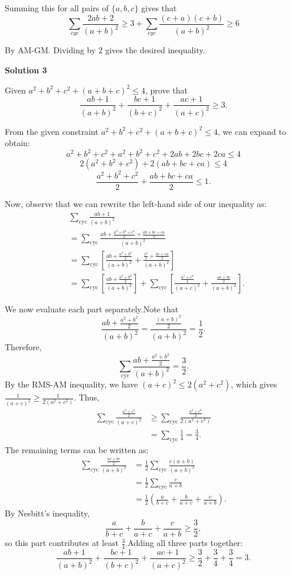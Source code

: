 \begin{enumerate}
 Summing this for all pairs of $\{ a,b,c \}$ gives that
 \[\sum_{cyc} \frac{2ab+2}{(a+b)^2} \ge 3+ \sum_{cyc}\frac{(c+a)(c+b)}{(a+b)^2} \ge 6\]

 By AM-GM. Dividing by $2$ gives the desired inequality.

 



\textbf{Solution 3}

Given $a^2+b^2+c^2+(a+b+c)^2 \leq 4$, prove that
 \[\frac{ab+1}{(a+b)^2}+\frac{bc+1}{(b+c)^2}+\frac{ac+1}{(a+c)^2} \geq 3.\]

 From the given constraint $a^2+b^2+c^2+(a+b+c)^2 \leq 4$, we can expand to obtain:
 \[a^2+b^2+c^2+a^2+b^2+c^2+2ab+2bc+2ca \leq 4\]
 \[2(a^2+b^2+c^2)+2(ab+bc+ca) \leq 4\]
 \[\frac{a^2+b^2+c^2}{2}+\frac{ab+bc+ca}{2} \leq 1.\]

 Now, observe that we can rewrite the left-hand side of our inequality as:\begin{align*}&\sum_{\text{cyc}} \frac{ab+1}{(a+b)^2} \\&= \sum_{\text{cyc}} \frac{ab+\frac{a^2+b^2+c^2}{2}+\frac{ab+bc+ca}{2}}{(a+b)^2} \\&= \sum_{\text{cyc}} \left[\frac{ab+\frac{a^2+b^2}{2}}{(a+b)^2} + \frac{\frac{c^2}{2}+\frac{bc+ca}{2}}{(a+b)^2}\right] \\&= \sum_{\text{cyc}} \left[\frac{ab+\frac{a^2+b^2}{2}}{(a+b)^2}\right] + \sum_{\text{cyc}} \left[\frac{\frac{a^2+c^2}{2}}{(a+c)^2} + \frac{\frac{ac+bc}{2}}{(a+b)^2}\right].\end{align*}


 We now evaluate each part separately.Note that 
 \[\frac{ab+\frac{a^2+b^2}{2}}{(a+b)^2} = \frac{\frac{(a+b)^2}{2}}{(a+b)^2} = \frac{1}{2}.\]Therefore, 
 \[\sum_{\text{cyc}} \frac{ab+\frac{a^2+b^2}{2}}{(a+b)^2} = \frac{3}{2}.\]By the RMS-AM inequality, we have $(a+c)^2 \leq 2(a^2+c^2)$, which gives $\frac{1}{(a+c)^2} \geq \frac{1}{2(a^2+c^2)}$. Thus,\begin{align*}\sum_{\text{cyc}} \frac{\frac{a^2+c^2}{2}}{(a+c)^2} &\geq \sum_{\text{cyc}} \frac{\frac{a^2+c^2}{2}}{2(a^2+c^2)} \\&= \sum_{\text{cyc}} \frac{1}{4} = \frac{3}{4}.\end{align*}
The remaining terms can be written as:\begin{align*}\sum_{\text{cyc}} \frac{\frac{ac+bc}{2}}{(a+b)^2} &= \frac{1}{2}\sum_{\text{cyc}} \frac{c(a+b)}{(a+b)^2} \\&= \frac{1}{2}\sum_{\text{cyc}} \frac{c}{a+b} \\&= \frac{1}{2}\left(\frac{a}{b+c}+\frac{b}{a+c}+\frac{c}{a+b}\right).\end{align*}
By Nesbitt's inequality, 
 \[\frac{a}{b+c}+\frac{b}{a+c}+\frac{c}{a+b} \geq \frac{3}{2},\]so this part contributes at least $\frac{3}{4}$.Adding all three parts together:
 \[\frac{ab+1}{(a+b)^2}+\frac{bc+1}{(b+c)^2}+\frac{ac+1}{(a+c)^2} \geq \frac{3}{2}+\frac{3}{4}+\frac{3}{4} = 3.\]


\end{enumerate}
